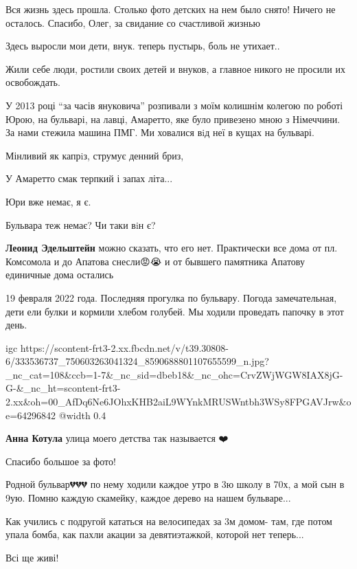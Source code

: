 
Вся жизнь здесь прошла. Столько фото детских на нем было снято! Ничего не осталось. Спасибо, Олег, за свидание со счастливой жизнью


Здесь выросли мои дети, внук. теперь пустырь, боль не утихает..


Жили себе люди, ростили своих детей и внуков, а главное никого не просили их освобождать.


У 2013 році \enquote{за часів януковича} розпивали з моїм колишнім колегою по роботі
Юрою, на бульварі, на лавці, Амаретто, яке було привезено мною з Німеччини. За
нами стежила машина ПМГ. Ми ховалися вiд неї в кущах на бульварі.

Мінливий як капрiз, струмує денний бриз,

У Амаретто смак терпкий і запах літа...

Юри вже немає, я є.

Бульвара теж немає? Чи таки вiн є?

\begin{itemize} %
\textbf{Леонид Эдельштейн} можно сказать, что его нет. Практически все дома от пл. Комсомола и до Апатова снесли😡😭 и от бывшего памятника Апатову единичные дома остались
\end{itemize} %


19 февраля 2022 года. Последняя прогулка по бульвару. Погода замечательная,
дети ели булки и кормили хлебом голубей. Мы ходили проведать папочку в этот
день.

\ifcmt
  igc https://scontent-frt3-2.xx.fbcdn.net/v/t39.30808-6/333536737_750603263041324_8590688801107655599_n.jpg?_nc_cat=108&ccb=1-7&_nc_sid=dbeb18&_nc_ohc=CrvZWjWGW8IAX8jG-G-&_nc_ht=scontent-frt3-2.xx&oh=00_AfDq6Ne6JOhxKHB2aiL9WYnkMRUSWntbh3WSy8FPGAVJrw&oe=64296842
	@width 0.4
\fi

\begin{itemize} %
\textbf{Анна Котула} улица моего детства так называется ❤️
\end{itemize} %


Спасибо большое за фото!


Родной бульвар💔💔💔 по нему ходили каждое утро в 3ю школу в 70х, а мой сын в
9ую. Помню каждую скамейку, каждое дерево на нашем бульваре...

Как учились с подругой кататься на велосипедах за 3м домом- там, где потом
упала бомба, как пахли акации за девятиэтажкой, которой нет теперь...


Всі ще живі!
